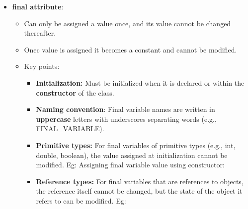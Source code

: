 \begin{flushleft}
\begin{itemize}
		\item \textbf{final attribute}:
		\begin{itemize}
			\item Can only be assigned a value once, and its value cannot be changed thereafter. \item Onec value is assigned it becomes a constant and cannot be modified.			
			\item Key points:
			\begin{itemize}
				\item \textbf{Initialization:} Must be initialized when it is declared or within the \textbf{constructor} of the class.
				\item \textbf{Naming convention}: Final variable names are written in \textbf{uppercase} letters with underscores separating words (e.g., FINAL\_VARIABLE).
				\item \textbf{Primitive types:} For final variables of primitive types (e.g., int, double, boolean), the value assigned at initialization cannot be modified.
				\newline
				Eg: Assigning final variable value using constructor:
				\bigskip
				\bigskip
				\bigskip
				\item \textbf{Reference types:} For final variables that are references to objects, the reference itself cannot be changed, but the state of the object it refers to can be modified.
				\newline
				Eg:
				\bigskip
\end{itemize}
\end{itemize}
\end{itemize}
\end{flushleft}

